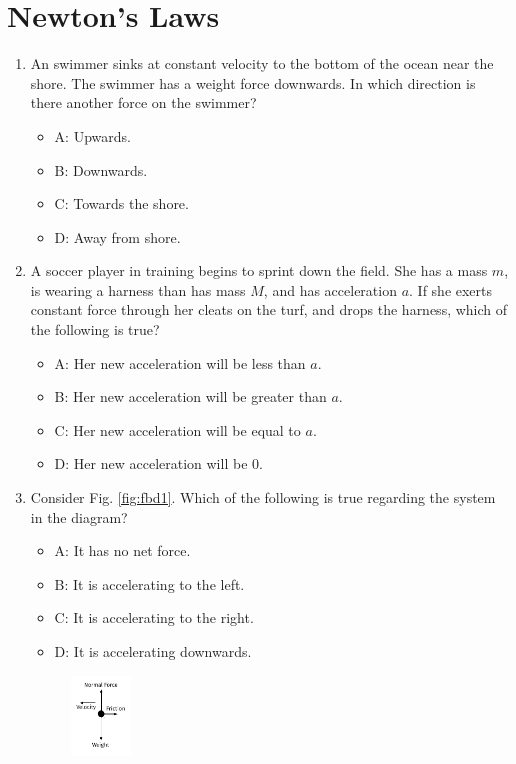 \documentclass[10pt]{article}
\begin{document}
\section{Newton's Laws}
\begin{enumerate}
\small
\item An swimmer sinks at constant velocity to the bottom of the ocean near the shore.  The swimmer has a weight force downwards.  In which direction is there another force on the swimmer?
\begin{itemize}
\item A: Upwards.
\item B: Downwards.
\item C: Towards the shore.
\item D: Away from shore.
\end{itemize}
\item A soccer player in training begins to sprint down the field.  She has a mass $m$, is wearing a harness than has mass $M$, and has acceleration $a$.  If she exerts constant force through her cleats on the turf, and drops the harness, which of the following is true?
\begin{itemize}
\item A: Her new acceleration will be less than $a$.
\item B: Her new acceleration will be greater than $a$.
\item C: Her new acceleration will be equal to $a$.
\item D: Her new acceleration will be 0.
\end{itemize}
\item Consider Fig. \ref{fig:fbd1}.  Which of the following is true regarding the system in the diagram?
\begin{itemize}
\item A: It has no net force.
\item B: It is accelerating to the left.
\item C: It is accelerating to the right.
\item D: It is accelerating downwards. 
\end{itemize}
\begin{figure}[h]
\centering
\includegraphics[width=0.15\textwidth]{figures/FBD3.pdf}

\end{figure}
\end{enumerate}
\end{document}
